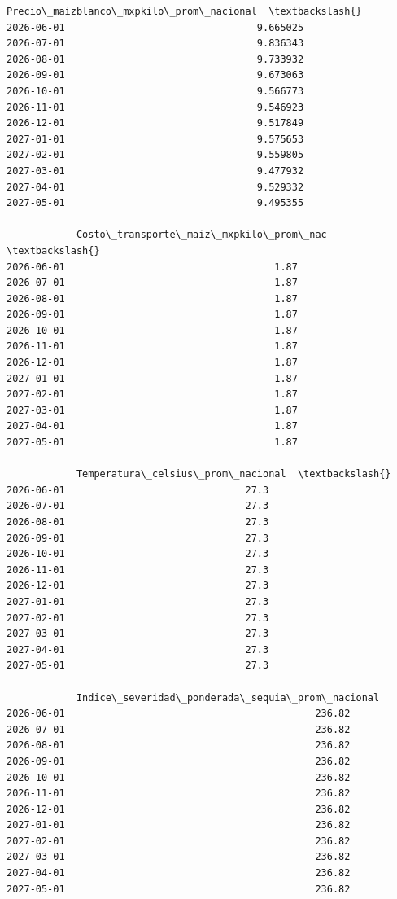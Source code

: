 \documentclass[11pt]{article}
\makeatletter
\newcommand{\boxspacing}{\kern\kvtcb@left@rule\kern\kvtcb@boxsep}
\newcommand{\prompt}[4]{
        {\ttfamily\llap{{\color{#2}[#3]:\hspace{3pt}#4}}\vspace{-\baselineskip}}
    }
\makeatother
\begin{document}
            \begin{tcolorbox}[breakable, size=fbox, boxrule=.5pt, pad at break*=1mm, opacityfill=0]
\prompt{Out}{outcolor}{277}{\boxspacing}
\begin{Verbatim}[commandchars=\\\{\}]
            Precio\_maizblanco\_mxpkilo\_prom\_nacional  \textbackslash{}
2026-06-01                                 9.665025
2026-07-01                                 9.836343
2026-08-01                                 9.733932
2026-09-01                                 9.673063
2026-10-01                                 9.566773
2026-11-01                                 9.546923
2026-12-01                                 9.517849
2027-01-01                                 9.575653
2027-02-01                                 9.559805
2027-03-01                                 9.477932
2027-04-01                                 9.529332
2027-05-01                                 9.495355

            Costo\_transporte\_maiz\_mxpkilo\_prom\_nac  \textbackslash{}
2026-06-01                                    1.87
2026-07-01                                    1.87
2026-08-01                                    1.87
2026-09-01                                    1.87
2026-10-01                                    1.87
2026-11-01                                    1.87
2026-12-01                                    1.87
2027-01-01                                    1.87
2027-02-01                                    1.87
2027-03-01                                    1.87
2027-04-01                                    1.87
2027-05-01                                    1.87

            Temperatura\_celsius\_prom\_nacional  \textbackslash{}
2026-06-01                               27.3
2026-07-01                               27.3
2026-08-01                               27.3
2026-09-01                               27.3
2026-10-01                               27.3
2026-11-01                               27.3
2026-12-01                               27.3
2027-01-01                               27.3
2027-02-01                               27.3
2027-03-01                               27.3
2027-04-01                               27.3
2027-05-01                               27.3

            Indice\_severidad\_ponderada\_sequia\_prom\_nacional
2026-06-01                                           236.82
2026-07-01                                           236.82
2026-08-01                                           236.82
2026-09-01                                           236.82
2026-10-01                                           236.82
2026-11-01                                           236.82
2026-12-01                                           236.82
2027-01-01                                           236.82
2027-02-01                                           236.82
2027-03-01                                           236.82
2027-04-01                                           236.82
2027-05-01                                           236.82
\end{Verbatim}
\end{tcolorbox}
        
\end{document}
